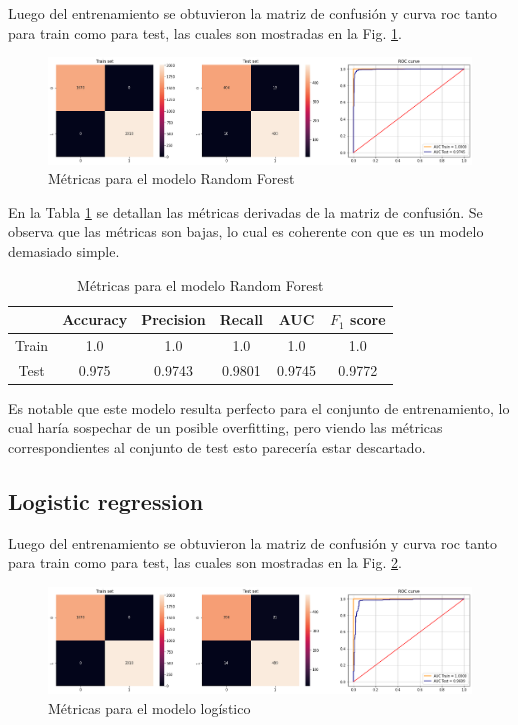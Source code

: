 Luego del entrenamiento se obtuvieron la matriz de confusión y curva roc tanto para train como para test, las cuales son mostradas en la Fig. \ref{fig.rf}. 

\begin{figure}[H]
\centering
        \includegraphics[width=\linewidth]{chapters/deteccion/images/rf.png}
        \caption{Métricas para el modelo Random Forest}
        \label{fig.rf}
  \end{figure}
  
 En la Tabla \ref{tabla.rf} se detallan las métricas derivadas de la matriz de confusión. Se observa que las métricas son bajas, lo cual es coherente con que es un modelo demasiado simple. 

\begin{table}[H]
\centering
\begin{tabular}{|c|c|c|c|c|c|}
\hline
      & Accuracy & Precision & Recall & AUC    & $F_1$ score \\ \hline
Train & 1.0   & 1.0    & 1.0 & 1.0 & 1.0      \\ \hline
Test  & 0.975      & 0.9743    & 0.9801 & 0.9745  & 0.9772      \\ \hline
\end{tabular}
\caption{Métricas para el modelo Random Forest}
\label{tabla.rf}
\end{table}

Es notable que este modelo resulta perfecto para el conjunto de entrenamiento, lo cual haría sospechar de un posible overfitting, pero viendo las métricas correspondientes al conjunto de test esto parecería estar descartado. 


\subsection{Logistic regression}

Luego del entrenamiento se obtuvieron la matriz de confusión y curva roc tanto para train como para test, las cuales son mostradas en la Fig. \ref{fig.lr}. 

\begin{figure}[H]
\centering
        \includegraphics[width=\linewidth]{chapters/deteccion/images/lr.png}
        \caption{Métricas para el modelo logístico}
        \label{fig.lr}
  \end{figure}
  

